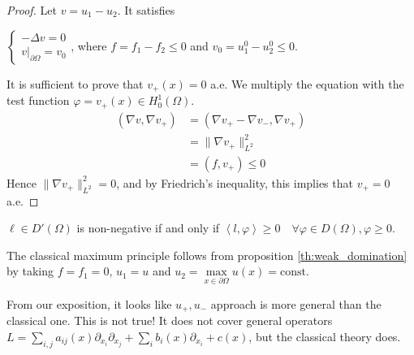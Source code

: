 \documentclass{report}
\begin{document}
\begin{proof}
    Let \(v = u_{1} - u_{2}\). It satisfies

    \(\begin{cases}
        -\Delta v = 0 \\
        \left. v \right|_{\partial \Omega} = v_{0}
    \end{cases}\), where \(f = f_{1} - f_{2} \leq 0\) and \(v_0 = u_{1}^{0} - u_{2}^{0} \leq 0\).

    It is sufficient to prove that \(v_{+}(x) = 0\) a.e. We multiply the equation with the test function \(\varphi = v_{+}(x) \in H^{1}_{0}(\Omega)\).
    \begin{align*}
        (\nabla v, \nabla v_{+}) &= (\nabla v_{+} - \nabla v_{-}, \nabla v_{+}) \\
        &= \|\nabla v_{+}\|_{L^{2}}^{2} \\
        &= (f, v_{+}) \leq 0
    \end{align*}
    Hence \(\|\nabla v_{+}\|_{L^{2}}^{2} = 0\), and by Friedrich's inequality, this implies that \(v_{+} = 0\) a.e.
\end{proof}

\begin{note}
    \(\ell \in D'(\Omega)\) is non-negative if and only if \(\left\langle l, \varphi \right\rangle \geq 0 \quad \forall \varphi \in D(\Omega), \varphi \geq 0\).
\end{note}

\begin{corollary}{}{}
    The classical maximum principle follows from proposition \ref{th:weak_domination} by taking \(f = f_{1} = 0\), \(u_{1} = u\) and \(u_{2} = \max\limits_{x \in \partial \Omega} u(x) = \text{const}\).
\end{corollary}

\begin{note}
    From our exposition, it looks like \(u_{+}, u_{-}\) approach is more general than the classical one. This is not true! It does not cover general operators \(L = \sum_{i, j}a_{ij}(x)\partial_{x_{i}}\partial_{x_{j}} + \sum_{i}b_{i}(x)\partial_{x_{i}} + c(x)\), but the classical theory does. 
\end{note}
\end{document}
